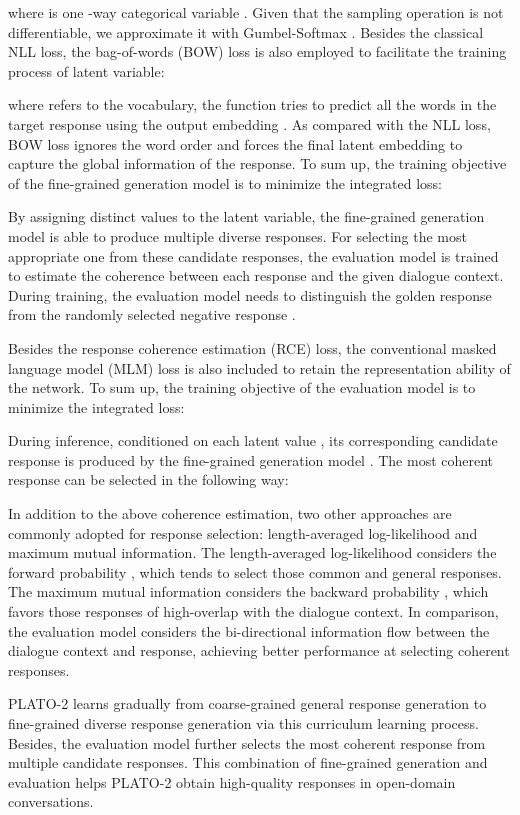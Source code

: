 \documentclass[letterpaper]{article} \usepackage{aaai21}  \usepackage{times}  \usepackage{helvet} \usepackage{courier}  \usepackage[hyphens]{url}  \usepackage{graphicx} \urlstyle{rm} \def\UrlFont{\rm}  \usepackage{natbib}  \usepackage{caption} \frenchspacing  \setlength{\pdfpagewidth}{8.5in}  \setlength{\pdfpageheight}{11in}  \usepackage{amsmath}
\begin{document}
where  is one -way categorical variable . Given that the sampling operation is not differentiable, we approximate it with Gumbel-Softmax \cite{jang2016categorical}. Besides the classical NLL loss, the bag-of-words (BOW) loss \cite{zhao2017learning} is also employed to facilitate the training process of latent variable:

where  refers to the vocabulary, the function  tries to predict all the words in the target response using the output embedding . As compared with the NLL loss, BOW loss ignores the word order and forces the final latent embedding to capture the global information of the response. To sum up, the training objective of the fine-grained generation model is to minimize the integrated loss:


By assigning distinct values to the latent variable, the fine-grained generation model is able to produce multiple diverse responses. For selecting the most appropriate one from these candidate responses, the evaluation model is trained to estimate the coherence between each response and the given dialogue context. During training, the evaluation model needs to distinguish the golden response  from the randomly selected negative response . 

Besides the response coherence estimation (RCE) loss, the conventional masked language model (MLM) loss \cite{devlin2019bert} is also included to retain the representation ability of the network. To sum up, the training objective of the evaluation model is to minimize the integrated loss:

During inference, conditioned on each latent value , its corresponding candidate response is produced by the fine-grained generation model . The most coherent response can be selected in the following way:

In addition to the above coherence estimation, two other approaches are commonly adopted for response selection: length-averaged log-likelihood and maximum mutual information. The length-averaged log-likelihood considers the forward probability , which tends to select those common and general responses. The maximum mutual information considers the backward probability , which favors those responses of high-overlap with the dialogue context. In comparison, the evaluation model  considers the bi-directional information flow between the dialogue context and response, achieving better performance at selecting coherent responses.

PLATO-2 learns gradually from coarse-grained general response generation to fine-grained diverse response generation via this curriculum learning process. Besides, the evaluation model further selects the most coherent response from multiple candidate responses. This combination of fine-grained generation and evaluation helps PLATO-2 obtain high-quality responses in open-domain conversations.
\end{document}
